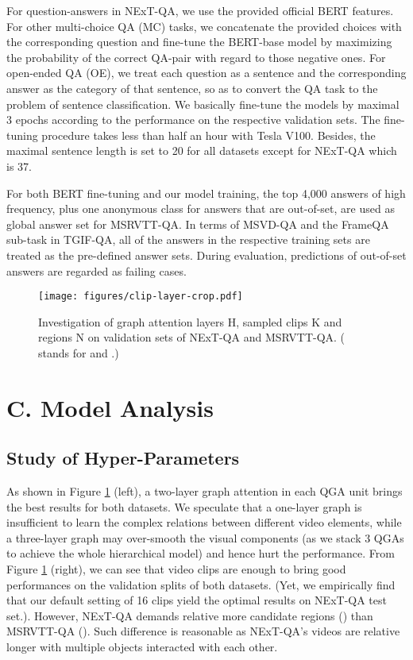 \documentclass[letterpaper]{article} \usepackage{aaai21}  \usepackage{times}  \usepackage{helvet} \usepackage{courier}  \usepackage[hyphens]{url}  \usepackage{graphicx} \urlstyle{rm} \def\UrlFont{\rm}  \usepackage{natbib}  \usepackage{caption} \usepackage{color, colortbl}
\begin{document}
For question-answers in NExT-QA, we use the provided official BERT \cite{devlin2018bert} features. For other multi-choice QA (MC) tasks, we concatenate the provided choices with the corresponding question and fine-tune the BERT-base model by maximizing the probability of the correct QA-pair with regard to those negative ones. For open-ended QA (OE), we treat each question as a sentence and the corresponding answer as the category of that sentence, so as to convert the QA task to the problem of sentence classification. We basically fine-tune the models by maximal 3 epochs according to the performance on the respective validation sets. The fine-tuning procedure takes less than half an hour with Tesla V100. Besides, the maximal sentence length is set to 20 for all datasets except for NExT-QA which is 37. 

For both BERT fine-tuning and our model training, the top 4,000 answers of high frequency, plus one anonymous class for answers that are out-of-set, are used as global answer set for MSRVTT-QA. In terms of MSVD-QA and the FrameQA sub-task in TGIF-QA, all of the answers in the respective training sets are treated as the pre-defined answer sets. During evaluation, predictions of out-of-set answers are regarded as failing cases.  
\begin{figure}[t!]
 \centering
 \texttt{[image: figures/clip-layer-crop.pdf]}
 \caption{Investigation of graph attention layers H, sampled clips K and regions N on validation sets of NExT-QA and MSRVTT-QA. ( stands for  and .)}
 \label{fig:layer_cr}
 \vspace{-1.0em}
\end{figure}

\section{C. Model Analysis}

\subsection{Study of Hyper-Parameters}
As shown in Figure \ref{fig:layer_cr} (left), a two-layer graph attention  in each QGA unit brings the best results for both datasets. We speculate that a one-layer graph is insufficient to learn the complex relations between different video elements, while a three-layer graph may over-smooth the visual components (as we stack 3 QGAs to achieve the whole hierarchical model) and hence hurt the performance. From Figure \ref{fig:layer_cr} (right), we can see that  video clips are enough to bring good performances on the validation splits of both datasets. (Yet, we empirically find that our default setting of 16 clips yield the optimal results on NExT-QA test set.). However, NExT-QA demands relative more candidate regions () than MSRVTT-QA (). Such difference is reasonable as NExT-QA's videos are relative longer with multiple objects interacted with each other.
\end{document}
